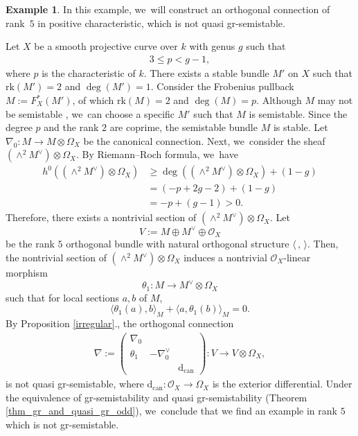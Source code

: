 \documentclass[11pt]{article}
\numberwithin{equation}{section}
\newcommand{\grsemistable}{gr\nobreakdash-semi\-stable\xspace}
\newcommand{\rk}{\mathrm{rk}}
\theoremstyle{plain}
\theoremstyle{definition}
\newtheorem{examp}[thm]{Example}
\begin{document}
\begin{examp}\label{exmp_const}
In this example, we~will construct an orthogonal connection of rank~$5$ in positive characteristic, which is not quasi \grsemistable.

Let $X$ be a smooth projective curve over $k$ with genus $g$ such that
\begin{align*}
3\leq p < g-1,
\end{align*}
where $p$ is the characteristic of $k$. There exists a stable bundle $M'$ on $X$ such that $\rk(M') = 2$ and $\deg(M')=1$. Consider the Frobenius pullback $M:=F^*_X(M')$, of which $\rk(M)=2$ and $\deg(M)=p$. Although $M$ may not be semistable \cite{Gi73}, we~can choose a specific $M'$ such that $M$ is semistable. Since the degree $p$ and the rank $2$ are coprime, the semistable bundle $M$ is stable. Let $\nabla_0: M \to M \otimes \Omega_X$ be the canonical connection. Next, we~consider the sheaf $(\wedge^2 M^{\vee}) \otimes \Omega_X$. By Riemann--Roch formula, we~have
\begin{align*}
h^0((\wedge^2 M^\vee) \otimes \Omega_X) & \geq \deg( (\wedge^2 M^\vee) \otimes \Omega_X ) + (1-g) \\
& = (-p+2g-2) + (1-g) \\
& = -p + (g-1) > 0.
\end{align*}
Therefore, there exists a nontrivial section of $(\wedge^2 M^{\vee}) \otimes \Omega_X$. Let
\[
V:= M \oplus M^{\vee} \oplus \mathcal{O}_X
\]
be the rank $5$ orthogonal bundle with natural orthogonal structure $\langle \,, \, \rangle$. Then, the nontrivial section of $(\wedge^2 M^{\vee}) \otimes \Omega_X$ induces a nontrivial $\mathcal{O}_X$-linear morphism
\[
\theta_1: M \to M^{\vee} \otimes \Omega_X
\]
such that for local sections $a,b$ of $M$,
\[
\langle \theta_1(a),b \rangle_M + \langle a,\theta_1(b) \rangle_M = 0.
\]
By Proposition \ref{irregular}., the orthogonal connection
\begin{align*}
\nabla:=
\begin{pmatrix}
\nabla_0 & & \\
\theta_1 & -\nabla^\vee_0 & \\
& & \mathrm{d}_\mathrm{can}
\end{pmatrix}: V \to V \otimes \Omega_X,
\end{align*}
is not quasi \grsemistable, where $\mathrm{d}_\mathrm{can}: \mathcal{O}_X \to \Omega_X$ is the exterior differential. Under the equivalence of gr-semistability and quasi gr-semistability (Theorem \ref{thm_gr_and_quasi_gr_odd}), we~conclude that we find an example in rank $5$ which is not \grsemistable.
\end{examp}
\end{document}
